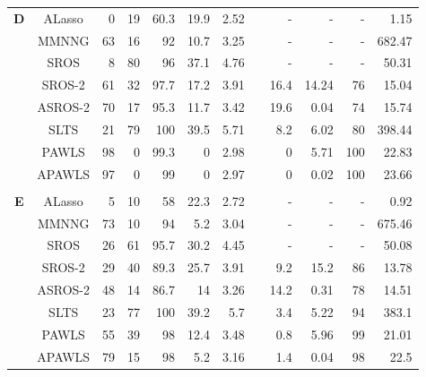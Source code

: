 \documentclass{article}\usepackage[]{graphicx}\usepackage[]{color}
\begin{document}
\begin{table}[thp]
\begin{center}
\begin{tabular}{ccrrrrrrrrrr}
	     \\
	       	  \multirow{8}{*}{{\bf D}}
	     	      & ALasso & 0 & 19 & 60.3 
	      & 19.9 & 2.52 & & -& - & - &  1.15\\
	      
	      & MMNNG & 63 & 16 & 92 
	      & 10.7 & 3.25& & -& - & - & 682.47\\
	      
	      & SROS & 8 & 80 & 96 
	      & 37.1 & 4.76 & & -& - & - &  50.31\\
	      
	       & SROS-2 & 61 & 32 & 97.7 
	      & 17.2 & 3.91 & & 16.4 
	      & 14.24 & 76 & 15.04\\
	      
	      & ASROS-2 & 70 & 17 & 95.3 
	      & 11.7 & 3.42 & & 19.6 
	      & 0.04 & 74 & 15.74\\
	      
	      
	       & SLTS & 21 & 79 & 100 
	      & 39.5 & 5.71 & & 8.2 
	      & 6.02 & 80 & 398.44\\
	      
	      & PAWLS & 98 & 0 & 99.3 
	      & 0 & 2.98 & & 0 
	      & 5.71 & 100 & 22.83\\
	      
	      & APAWLS & 97 & 0 & 99 
	      & 0 & 2.97 & & 0 
	      & 0.02 & 100 & 23.66\\
	      
	      \\
	       	  \multirow{8}{*}{{\bf E}}
	    	      & ALasso & 5 & 10 & 58 
	      & 22.3 & 2.72 & & -& - & - &  0.92\\
	      
	      & MMNNG & 73 & 10 & 94 
	      & 5.2 & 3.04 & & -& - & - &  675.46\\
	      
	      & SROS & 26 & 61 & 95.7 
	      & 30.2 & 4.45 & & -& - & - &  50.08\\
	      
	       & SROS-2 & 29 & 40 & 89.3 
	      & 25.7 & 3.91 & & 9.2 
	      & 15.2 & 86 & 13.78\\
	      
	      & ASROS-2 & 48 & 14 & 86.7 
	      & 14 & 3.26 & & 14.2 
	      & 0.31 & 78 & 14.51\\
	      
	      
	       & SLTS & 23 & 77 & 100 
	      & 39.2 & 5.7 & & 3.4 
	      & 5.22 & 94 & 383.1\\
	      
	      & PAWLS & 55 & 39 & 98 
	      & 12.4 & 3.48 & & 0.8 
	      & 5.96 & 99 & 21.01\\
	      
	      & APAWLS & 79 & 15 & 98 
	      & 5.2 & 3.16 & & 1.4 
	      & 0.04& 98 & 22.5\\
	      
	   \hline\hline
	
	\end{tabular}
	\end{center}
	\end{table}
	
\end{document}
